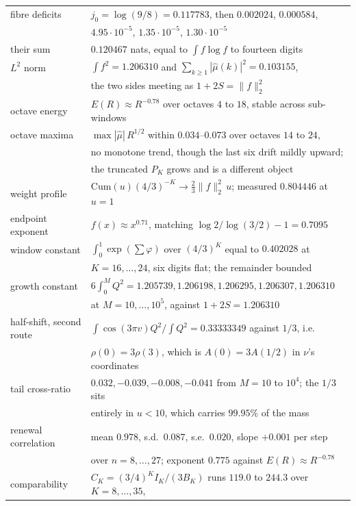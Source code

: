 \documentclass[11pt]{article}
\theoremstyle{remark}
\begin{document}
\begin{center}
\small
\begin{tabular}{ll}
\toprule
fibre deficits & $j_0=\log(9/8)=0.117783$, then $0.002024$, $0.000584$,\\
& $4.95\cdot10^{-5}$, $1.35\cdot10^{-5}$, $1.30\cdot10^{-5}$\\
their sum & $0.120467$ nats, equal to $\int f\log f$ to fourteen digits\\
$L^2$ norm & $\int f^2=1.206310$ and $\sum_{k\ge1}|\hat\mu(k)|^2=0.103155$,\\
& the two sides meeting as $1+2S=\|f\|_2^2$\\
octave energy & $E(R)\approx R^{-0.78}$ over octaves $4$ to $18$, stable across sub-windows\\
octave maxima & $\max|\hat\mu|\,R^{1/2}$ within $0.034$--$0.073$ over octaves $14$ to $24$,\\
& no monotone trend, though the last six drift mildly upward;\\
& the truncated $P_K$ grows and is a different object\\
weight profile & $\mathrm{Cum}(u)(4/3)^{-K}\to\tfrac23\|f\|_2^2\,u$; measured $0.804446$ at $u=1$\\
endpoint exponent & $f(x)\approx x^{0.71}$, matching $\log2/\log(3/2)-1=0.7095$\\
window constant & $\int_0^1\exp(\sum\varphi)$ over $(4/3)^K$ equal to $0.402028$ at\\
& $K=16,\dots,24$, six digits flat; the remainder bounded\\
growth constant & $6\int_0^MQ^2=1.205739,1.206198,1.206295,1.206307,1.206310$\\
& at $M=10,\dots,10^5$, against $1+2S=1.206310$\\
half-shift, second route & $\int\cos(3\pi v)Q^2/\int Q^2=0.33333349$ against $1/3$, i.e.\\
& $\rho(0)=3\rho(3)$, which is $A(0)=3A(1/2)$ in $\nu$'s coordinates\\
tail cross-ratio & $0.032,-0.039,-0.008,-0.041$ from $M=10$ to $10^4$; the $1/3$ sits\\
& entirely in $u<10$, which carries $99.95\%$ of the mass\\
renewal correlation & mean $0.978$, s.d.\ $0.087$, s.e.\ $0.020$, slope $+0.001$ per step\\
& over $n=8,\dots,27$; exponent $0.775$ against $E(R)\approx R^{-0.78}$\\
comparability & $C_K=(3/4)^KI_K/(3B_K)$ runs $119.0$ to $244.3$ over $K=8,\dots,35$,\\

\end{tabular}
\end{center}
\end{document}
